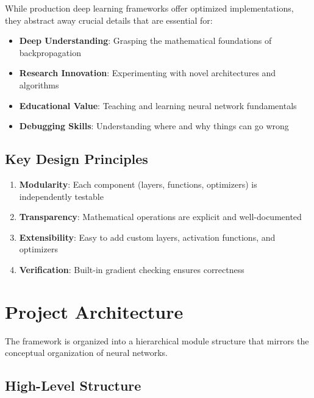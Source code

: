 \documentclass[12pt,a4paper]{article}
\begin{document}
While production deep learning frameworks offer optimized implementations, they abstract away crucial details that are essential for:
\begin{itemize}
    \item \textbf{Deep Understanding}: Grasping the mathematical foundations of backpropagation
    \item \textbf{Research Innovation}: Experimenting with novel architectures and algorithms
    \item \textbf{Educational Value}: Teaching and learning neural network fundamentals
    \item \textbf{Debugging Skills}: Understanding where and why things can go wrong
\end{itemize}

\subsection{Key Design Principles}

\begin{enumerate}
    \item \textbf{Modularity}: Each component (layers, functions, optimizers) is independently testable
    \item \textbf{Transparency}: Mathematical operations are explicit and well-documented
    \item \textbf{Extensibility}: Easy to add custom layers, activation functions, and optimizers
    \item \textbf{Verification}: Built-in gradient checking ensures correctness
\end{enumerate}

\section{Project Architecture}

The framework is organized into a hierarchical module structure that mirrors the conceptual organization of neural networks.

\subsection{High-Level Structure}
\end{document}

